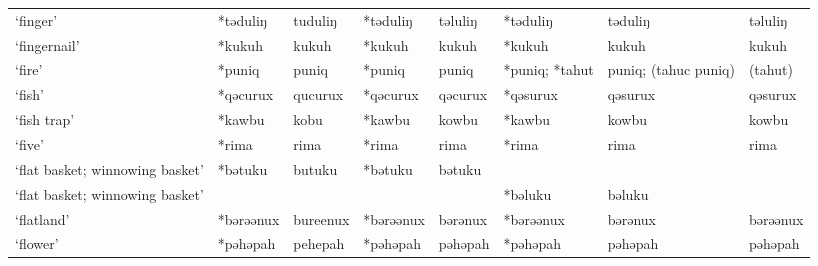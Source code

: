 \begin{landscape}
\begin{longtable}[c]{@{}p{3cm}<{\raggedright}p{2.75cm}<{\raggedright}p{2.75cm}<{\raggedright}p{2.75cm}<{\raggedright}p{2.75cm}<{\raggedright}p{2.75cm}<{\raggedright}p{2.75cm}<{\raggedright}p{2.75cm}<{\raggedright}@{}}
`finger'                                             & *təduliŋ           & tuduliŋ                        & *təduliŋ           & təluliŋ                    & *təduliŋ         & təduliŋ                  & təluliŋ                           \\
`fingernail'                                         & *kukuh             & kukuh                          & *kukuh             & kukuh                      & *kukuh           & kukuh                    & kukuh                             \\
`fire'                                               & *puniq             & puniq                          & *puniq             & puniq                      & *puniq; *tahut   & puniq; (tahuc puniq)     & (tahut)                           \\
`fish'                                               & *qəcurux           & qucurux                        & *qəcurux           & qəcurux                    & *qəsurux         & qəsurux                  & qəsurux                           \\
`fish trap'                                          & *kawbu             & kobu                           & *kawbu             & kowbu                      & *kawbu           & kowbu                    & kowbu                             \\
`five'                                               & *rima              & rima                           & *rima              & rima                       & *rima            & rima                     & rima                              \\
`flat basket; winnowing basket'                      & *bətuku            & butuku                         & *bətuku            & bətuku                     &                  &                          &                                   \\
`flat basket; winnowing basket'                      &                    &                                &                    &                            & *bəluku          & bəluku                   &                                   \\
`flatland'                                           & *bərəənux          & bureenux                       & *bərəənux          & bərənux                    & *bərəənux        & bərənux                  & bərəənux                          \\
`flower'                                             & *pəhəpah           & pehepah                        & *pəhəpah           & pəhəpah                    & *pəhəpah         & pəhəpah                  & pəhəpah                           \\

\end{longtable}
\end{landscape}
